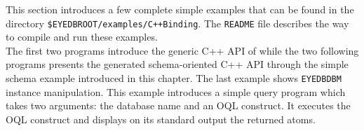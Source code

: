 







This section introduces a few complete simple examples that can be found
in the directory
\texttt{\$EYEDBROOT/examples/C++Binding}.
The \texttt{README} file describes the way to compile and run these examples.
\\
The first two programs introduce the generic C++ API of
\eyedb while the two following programs presents the
generated schema-oriented C++ API through the simple schema example introduced
in this chapter. The last example shows \texttt{EYEDBDBM} instance
manipulation.
This example introduces a simple query program which takes
two arguments: the database name and an OQL construct. It executes
the OQL construct and displays on its standard output the returned
atoms.
\verbsize
